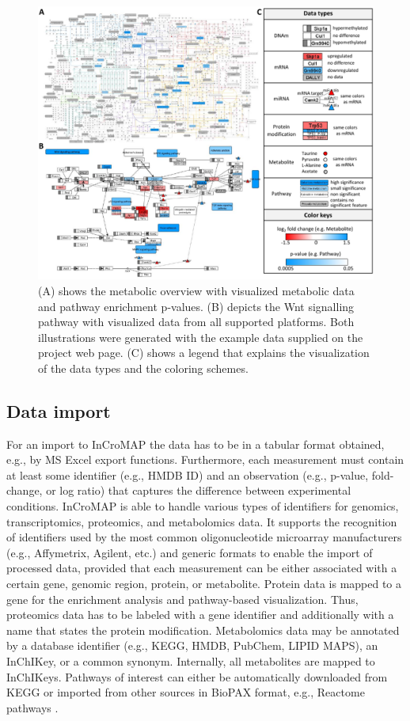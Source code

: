 \documentclass[final,5p,times,twocolumn]{elsarticle}
\begin{document}
\begin{figure}[t]
\center
\includegraphics[width=1.0\textwidth]{InCroMAP_examples.pdf}
\caption{(A) shows the metabolic overview with visualized metabolic data and pathway enrichment p-values. (B) depicts the Wnt signalling pathway with visualized data from all supported platforms. Both illustrations were generated with the example data supplied on the project web page. (C) shows a legend that explains the visualization of the data types and the coloring schemes.}
\label{fig:incromap-examples}
\end{figure}

\subsection{Data import}
For an import to InCroMAP the data has to be in a tabular format obtained, e.g., by MS Excel export functions. Furthermore, each measurement must contain at least some identifier (e.g., HMDB ID) and an observation (e.g., p-value, fold-change, or log ratio) that captures the difference between experimental conditions. InCroMAP is able to handle various types of identifiers for genomics, transcriptomics, proteomics, and metabolomics data. It supports the recognition of identifiers used by the most common oligonucleotide microarray manufacturers (e.g., Affymetrix, Agilent, etc.) and generic formats to enable the import of processed data, provided that each measurement can be either associated with a certain gene, genomic region, protein, or metabolite. Protein data is mapped to a gene for the enrichment analysis and pathway-based visualization. Thus, proteomics data has to be labeled with a gene identifier and additionally with a name that states the protein modification. Metabolomics data may be annotated by a database identifier (e.g., KEGG, HMDB, PubChem, LIPID MAPS), an InChIKey, or a common synonym. Internally, all metabolites are mapped to InChIKeys. Pathways of interest can either be automatically downloaded from KEGG or imported from other sources in BioPAX format, e.g., Reactome pathways \cite{Eustachio2011}.
\end{document}

